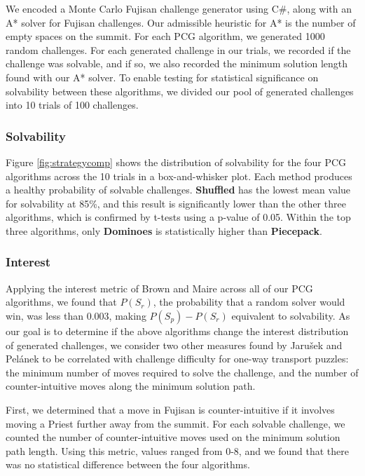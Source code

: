 \documentclass[journal]{IEEEtran}
\begin{document}
We encoded a Monte Carlo Fujisan challenge generator using C\#, along with an A* solver for Fujisan challenges. Our admissible heuristic for A* is the number of empty spaces on the summit. For each PCG algorithm, we generated 1000 random challenges.
For each generated challenge in our trials, we recorded if the challenge was solvable, and if so, we also recorded the minimum solution length found with our A* solver. To enable testing for statistical significance on solvability between these algorithms, we divided our pool of generated challenges into 10 trials of 100 challenges. 
 
\subsubsection{Solvability}

Figure \ref{fig:strategycomp} shows the distribution of solvability for the four PCG algorithms across the 10 trials in a box-and-whisker plot. Each method produces a healthy probability of solvable challenges. {\bf Shuffled} has the lowest mean value for solvability at 85\%, and this result is significantly lower than the other three algorithms, which is confirmed by t-tests using a p-value of 0.05. Within the top three algorithms, only {\bf Dominoes} is statistically higher than {\bf Piecepack}. 

\subsubsection{Interest}

Applying the interest metric of Brown and Maire \cite{MCPUZZLE} across all of our PCG algorithms, we found that $P(S_r)$, the probability that a random solver would win, was less than 0.003, making $P(S_p) - P(S_r)$ equivalent to solvability. As our goal is to determine if the above algorithms change the interest distribution of generated challenges, we consider two other measures found by 
Jaru{\v{s}}ek and Pel{\'a}nek to be correlated with challenge difficulty for one-way transport puzzles:
the minimum number of moves required to solve the challenge, and the number of counter-intuitive moves along the minimum solution path. \cite{jaruvsek2010difficulty}
\cite{jaruvsek2011determines}

First, we determined that a move in Fujisan is counter-intuitive if it involves moving a Priest further away from the summit. For each solvable challenge, we counted the number of counter-intuitive moves used on the minimum solution path length. Using this metric, values ranged from 0-8, and we found that there was no statistical difference between the four algorithms.
\end{document}
